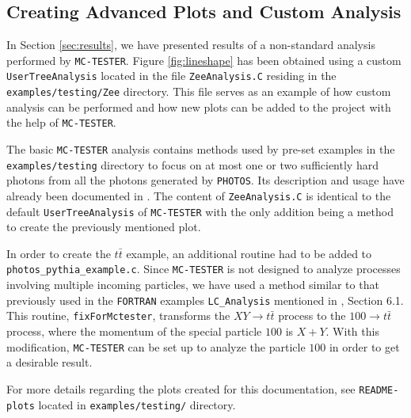 \documentclass[]{Photos_interface_design}
\begin{document}
\subsection{Creating Advanced Plots and Custom Analysis}
\label{App:Plots}

In Section \ref{sec:results}, we have presented results of a non-standard
analysis performed by {\tt MC-TESTER}. Figure \ref{fig:lineshape} has been
obtained using a custom {\tt UserTreeAnalysis} located in the file {\tt ZeeAnalysis.C}
residing in the {\tt examples/testing/Zee} directory. This file serves as an
example of how custom analysis can be performed and how new plots can be
added to the project with the help of {\tt MC-TESTER}.

The basic {\tt MC-TESTER} analysis contains methods used by pre-set examples
in the {\tt examples/testing} directory to focus on at most one or two 
sufficiently hard photons from all the photons generated
by {\tt PHOTOS}. Its description and usage have already been documented in \cite{Davidson:2008ma}.
The content of {\tt ZeeAnalysis.C} is identical to the default {\tt UserTreeAnalysis}
of {\tt MC-TESTER} with the only addition being a method to create
the previously mentioned plot.

In order to create the $t \bar t$ example, an additional routine had to be added to {\tt photos\_pythia\_example.c}.
Since {\tt MC-TESTER} is not designed to analyze processes involving
multiple incoming particles, we have used a method similar to that previously
used in the {\tt FORTRAN} examples {\tt LC\_Analysis} mentioned in \cite{Golonka:2002rz}, Section 6.1.
This routine, {\tt fixForMctester}, transforms the $X Y \rightarrow t \bar t$
process to the $100 \rightarrow t \bar t$ process,
where the momentum of the
special particle $100$ is $X + Y$. With this modification, {\tt MC-TESTER} can be set
up to analyze the particle $100$ in order to get a desirable result.

For more details regarding the plots created for this documentation, see
{\tt README-plots} located in {\tt examples/testing/} directory.


\end{document}
